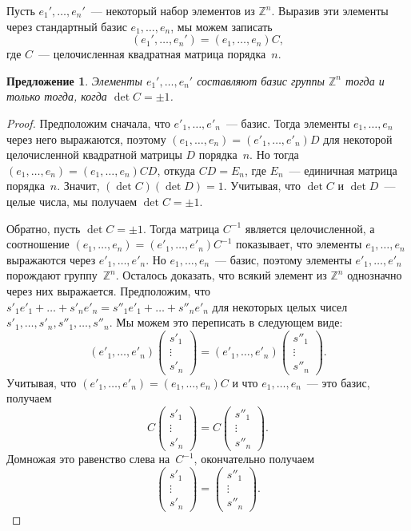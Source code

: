 \documentclass[a4paper,10pt]{amsart}
\def\ZZ{{\mathbb Z}}%
\newtheorem{proposition}{Предложение}
\theoremstyle{definition}
\theoremstyle{remark}
\begin{document}
Пусть $e_1', \ldots, e_n'$~--- некоторый набор элементов из $\ZZ^n$.
Выразив эти элементы через стандартный базис $e_1, \ldots, e_n$, мы
можем записать
$$
(e_1', \ldots, e_n') = (e_1, \ldots, e_n)C,
$$
где $C$~--- целочисленная квадратная матрица порядка~$n$.

\begin{proposition}
Элементы $e_1', \ldots, e_n'$ составляют базис группы $\ZZ^n$ тогда
и только тогда, когда $\det C = \pm 1$.
\end{proposition}

\begin{proof}
Предположим сначала, что $e'_1, \ldots, e'_n$~--- базис. Тогда
элементы $e_1, \ldots, e_n$ через него выражаются, поэтому $(e_1,
\ldots, e_n) = (e'_1, \ldots, e'_n) D$ для некоторой целочисленной
квадратной матрицы $D$ порядка~$n$. Но тогда $(e_1, \ldots, e_n) =
(e_1, \ldots, e_n)CD$, откуда $CD = E_n$, где $E_n$~--- единичная
матрица порядка~$n$. Значит, $(\det C)(\det D) = 1$. Учитывая, что
$\det C$ и $\det D$~--- целые числа, мы получаем $\det C = \pm 1$.

Обратно, пусть $\det C = \pm 1$. Тогда матрица $C^{-1}$ является
целочисленной, а соотношение $(e_1, \ldots, e_n) = (e'_1, \ldots,
e'_n)C^{-1}$ показывает, что элементы $e_1, \ldots, e_n$ выражаются
через $e'_1, \ldots, e'_n$. Но $e_1, \ldots, e_n$~--- базис, поэтому
элементы $e'_1, \ldots, e'_n$ порождают группу~$\ZZ^n$. Осталось
доказать, что всякий элемент из $\ZZ^n$ однозначно через них
выражается. Предположим, что $s'_1e'_1 + \ldots + s'_ne'_n =
s''_1e'_1 + \ldots + s''_n e'_n$ для некоторых целых чисел $s'_1,
\ldots, s'_n, s''_1, \ldots, s''_n$. Мы можем это переписать в
следующем виде:
$$
(e'_1, \ldots, e'_n)
\begin{pmatrix} s'_1 \\ \vdots \\ s'_n \end{pmatrix} =
(e'_1, \ldots, e'_n)
\begin{pmatrix} s''_1 \\ \vdots \\ s''_n \end{pmatrix}.
$$
Учитывая, что $(e'_1, \ldots, e'_n) = (e_1, \ldots, e_n)C$ и что
$e_1, \ldots, e_n$~--- это базис, получаем
$$
C \begin{pmatrix} s'_1 \\ \vdots \\ s'_n \end{pmatrix} = C
\begin{pmatrix} s''_1 \\ \vdots \\ s''_n \end{pmatrix}.
$$
Домножая это равенство слева на~$C^{-1}$, окончательно получаем
$$
\begin{pmatrix} s'_1 \\ \vdots \\ s'_n \end{pmatrix} =
\begin{pmatrix} s''_1 \\ \vdots \\ s''_n \end{pmatrix}.
$$
\end{proof}
\end{document}
